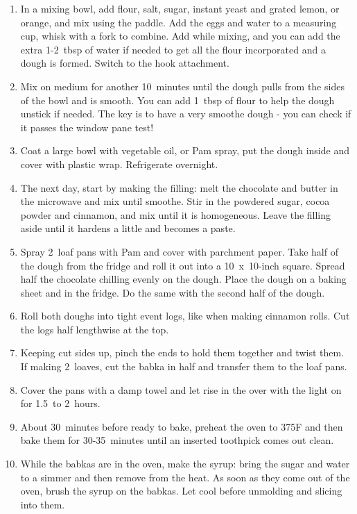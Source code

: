 \begin{enumerate}
    \item In a mixing bowl, add flour, salt, sugar, instant yeast and grated lemon, or orange, and mix using the paddle. Add the eggs and water to a measuring cup, whisk with a fork to combine. Add while mixing, and you can add the extra 1-2~tbsp of water if needed to get all the flour incorporated and a dough is formed. Switch to the hook attachment.
    \item Mix on medium for another 10~minutes until the dough pulls from the sides of the bowl and is smooth. You can add 1~tbsp of flour to help the dough unstick if needed. The key is to have a very smoothe dough - you can check if it passes the window pane test!
    \item Coat a large bowl with vegetable oil, or Pam spray, put the dough inside and cover with plastic wrap. Refrigerate overnight.
    \item The next day, start by making the filling: melt the chocolate and butter in the microwave and mix until smoothe. Stir in the powdered sugar, cocoa powder and cinnamon, and mix until it is homogeneous. Leave the filling aside until it hardens a little and becomes a paste.
    \item Spray 2~loaf pans with Pam and cover with parchment paper. Take half of the dough from the fridge and roll it out into a 10~x~10-inch square. Spread half the chocolate chilling evenly on the dough. Place the dough on a baking sheet and in the fridge. Do the same with the second half of the dough.
    \item Roll both doughs into tight event logs, like when making cinnamon rolls. Cut the logs half lengthwise at the top.
    \item Keeping cut sides up, pinch the ends to hold them together and twist them. If making 2~loaves, cut the babka in half and transfer them to the loaf pans.
    \item Cover the pans with a damp towel and let rise in the over with the light on for 1.5~to 2~hours.
    \item About 30~minutes before ready to bake, preheat the oven to 375\degree F and then bake them for 30-35~minutes until an inserted toothpick comes out clean.
    \item While the babkas are in the oven, make the syrup: bring the sugar and water to a simmer and then remove from the heat. As soon as they come out of the oven, brush the syrup on the babkas. Let cool before unmolding and slicing into them.
\end{enumerate}

